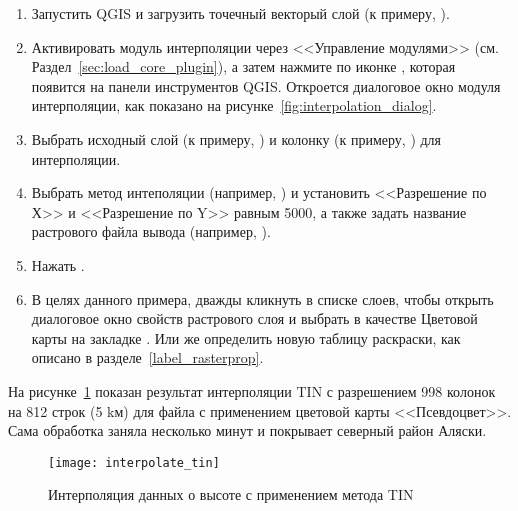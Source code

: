 \label{interpolation_usage}

\begin{enumerate}
  \item Запустить QGIS и загрузить точечный векторый слой (к примеру,
  ).
  \item Активировать модуль интерполяции через <<Управление модулями>>
  (см. Раздел~\ref{sec:load_core_plugin}), а затем нажмите по иконке
  , которая появится на панели
  инструментов QGIS. Откроется диалоговое окно модуля интерполяции, как
  показано на рисунке~\ref{fig:interpolation_dialog}.
  \item Выбрать исходный слой (к примеру, )
  и колонку (к примеру, ) для интерполяции.
  \item Выбрать метод интеполяции (например,
  ) и установить <<Разрешение по Х>>
  и <<Разрешение по Y>> равным 5000, а также задать название растрового
  файла вывода (например, ).
  \item Нажать .
  \item В целях данного примера, дважды кликнуть 
  в списке слоев, чтобы открыть диалоговое окно свойств растрового слоя
  и выбрать  в качестве Цветовой
  карты на закладке . Или же определить новую таблицу
  раскраски, как описано в разделе~\ref{label_rasterprop}.
\end{enumerate}

На рисунке~\ref{fig:interpolation_idw} показан результат интерполяции
TIN с разрешением 998 колонок на 812 строк (5 kм) для файла
 с применением цветовой карты <<Псевдоцвет>>. Сама
обработка заняла несколько минут и покрывает северный район Аляски.

\begin{figure}[ht]
   \centering
   \texttt{[image: interpolate\_tin]}
   \caption{Интерполяция данных о высоте с применением метода TIN \nixcaption}\label{fig:interpolation_idw}
\end{figure}

\FloatBarrier
